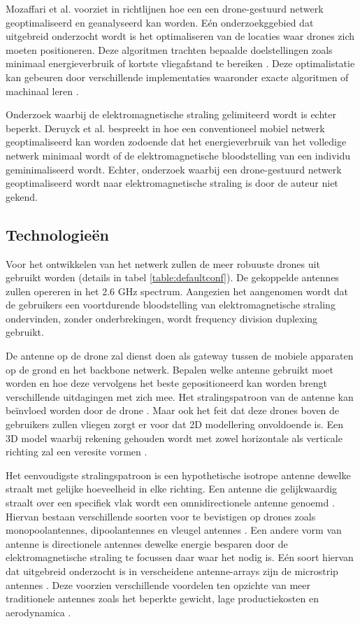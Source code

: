 \documentclass[twocolumn]{phdsymp_dutch}
\begin{document}
Mozaffari et al. voorziet in \cite{U3} richtlijnen hoe een een drone-gestuurd netwerk geoptimaliseerd en geanalyseerd kan worden.
Eén onderzoekggebied dat uitgebreid onderzocht wordt is het optimaliseren van de locaties waar drones zich moeten positioneren.
Deze algoritmen trachten bepaalde doelstellingen zoals minimaal energieverbruik of kortste vliegafstand te bereiken \cite{U6,U7,U8,U9}.
Deze optimalistatie kan gebeuren door verschillende implementaties waaronder exacte algoritmen of machinaal leren \cite{U3,U5}.

Onderzoek waarbij de elektromagnetische straling gelimiteerd wordt is echter beperkt.
Deruyck et al. bespreekt in \cite{J1} hoe een conventioneel mobiel netwerk geoptimaliseerd kan worden zodoende dat het energieverbruik 
van het volledige netwerk minimaal wordt of de elektromagnetische bloodstelling van een individu geminimaliseerd wordt.
Echter, onderzoek waarbij een drone-gestuurd netwerk geoptimaliseerd wordt naar elektromagnetische straling is 
door de auteur niet gekend.

\subsection{Technologie\"en}
Voor het ontwikkelen van het netwerk zullen de meer robuuste drones uit \cite{J2} gebruikt worden (details in tabel \ref{table:defaultconf}). De 
gekoppelde antennes zullen opereren in het 2.6 GHz spectrum. Aangezien het aangenomen wordt dat de gebruikers een voortdurende bloodstelling
van  elektromagnetische straling ondervinden, zonder onderbrekingen, wordt frequency division duplexing gebruikt. 

De antenne op de drone zal dienst doen als gateway tussen de mobiele apparaten op de grond en het backbone netwerk.
Bepalen welke antenne gebruikt moet worden en hoe deze vervolgens het beste gepositioneerd kan worden brengt 
verschillende uitdagingen met zich mee. Het stralingspatroon van de antenne kan be\"invloed worden door de drone \cite{A1}.
Maar ook het feit dat deze drones boven de gebruikers zullen vliegen zorgt er voor dat 2D modellering onvoldoende is.
Een 3D model waarbij rekening gehouden wordt met zowel horizontale als verticale richting zal een veresite vormen \cite{U12}.

Het eenvoudigste stralingspatroon is een hypothetische isotrope antenne dewelke straalt met gelijke hoeveelheid in elke richting.
Een antenne die gelijkwaardig straalt over een specifiek vlak wordt een omnidirectionele antenne genoemd 
\cite{U12}. Hiervan bestaan verschillende soorten voor te bevistigen op drones zoals monopoolantennes, dipoolantennes en vleugel antennes \cite{A4,A10,A11,A12}.
Een andere vorm van antenne is directionele antennes dewelke energie besparen door de elektromagnetische straling 
te focussen daar waar het nodig is. Eén soort hiervan dat uitgebreid onderzocht is in verscheidene antenne-arrays 
zijn de microstrip antennes \cite{A5,A6,A8}.
Deze voorzien verschillende voordelen ten opzichte van meer traditionele antennes 
zoals het beperkte gewicht, lage productiekosten en aerodynamica \cite{J13_microstripadvantages,J14_antennadesign}.
\end{document}
